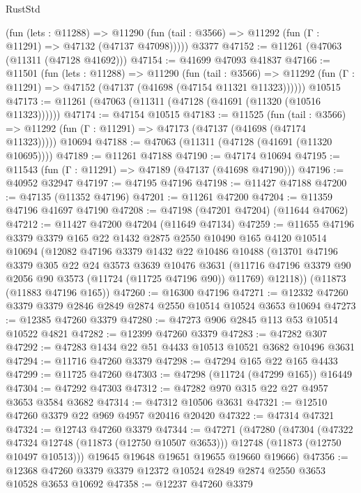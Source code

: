 \begin{lexlean}{RustStd}
\begin{coremodule}
      (fun (lets : @11288) =>
      @11290 (fun (tail : @3566) => @11292 (fun (Γ : @11291) => @47132 (@47137 @47098)))))
    @3377
@47152 := @11261 (@47063 (@11311 (@47128 @41692)))
@47154 := @41699 @47093 @41837
@47166 := @11501
    (fun (lets : @11288) =>
    @11290
      (fun (tail : @3566) =>
      @11292 (fun (Γ : @11291) => @47152 (@47137 (@41698 (@47154 @11321 @11323))))))
    @10515
@47173 := @11261 (@47063 (@11311 (@47128 (@41691 (@11320 (@10516 @11323))))))
@47174 := @47154 @10515
@47183 := @11525
    (fun (tail : @3566) => @11292 (fun (Γ : @11291) => @47173 (@47137 (@41698 (@47174 @11323)))))
    @10694
@47188 := @47063 (@11311 (@47128 (@41691 (@11320 @10695))))
@47189 := @11261 @47188
@47190 := @47174 @10694
@47195 := @11543 (fun (Γ : @11291) => @47189 (@47137 (@41698 @47190)))
@47196 := @40952 @32947
@47197 := @47195 @47196
@47198 := @11427 @47188
@47200 := @47135 (@11352 @47196)
@47201 := @11261 @47200
@47204 := @11359 @47196 @41697 @47190
@47208 := @47198 (@47201 @47204) (@11644 @47062)
@47212 := @11427 @47200 @47204 (@11649 @47134)
@47259 := @11655
    @47196
    @3379
    @3379
    @165
    @22
    @1432
    @2875
    @2550
    @10490
    @165
    @4120
    @10514
    @10694
    (@12082
      @47196
      @3379
      @1432
      @22
      @10486
      @10488
      (@13701
        @47196
        @3379
        @305
        @22
        @24
        @3573
        @3639
        @10476
        @3631
        (@11716 @47196 @3379 @90 @2056 @90 @3573 (@11724 (@11725 @47196 @90)) @11769)
        @12118))
    (@11873 (@11883 @47196 @165))
@47260 := @16300 @47196
@47271 := @12332 @47260 @3379 @3379 @2846 @2849 @2874 @2550 @10514 @10524 @3653 @10694
@47273 := @12385 @47260 @3379
@47280 := @47273 @906 @2845 @113 @53 @10514 @10522 @4821
@47282 := @12399 @47260 @3379
@47283 := @47282 @307
@47292 := @47283 @1434 @22 @51 @4433 @10513 @10521 @3682 @10496 @3631
@47294 := @11716 @47260 @3379
@47298 := @47294 @165 @22 @165 @4433
@47299 := @11725 @47260
@47303 := @47298 (@11724 (@47299 @165)) @16449
@47304 := @47292 @47303
@47312 := @47282 @970 @315 @22 @27 @4957 @3653 @3584 @3682
@47314 := @47312 @10506 @3631
@47321 := @12510 @47260 @3379 @22 @969 @4957 @20416 @20420
@47322 := @47314 @47321
@47324 := @12743 @47260 @3379
@47344 := @47271
    (@47280
      (@47304
        (@47322 @47324 @12748 (@11873 (@12750 @10507 @3653)))
        @12748
        (@11873 (@12750 @10497 @10513)))
      @19645
      @19648
      @19651
      @19655
      @19660
      @19666)
@47356 := @12368 @47260 @3379 @3379 @12372 @10524 @2849 @2874 @2550 @3653 @10528 @3653 @10692
@47358 := @12237 @47260 @3379

\end{coremodule}
\end{lexlean}
